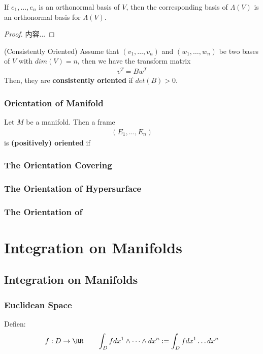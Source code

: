 \documentclass[Total.tex]{subfiles}
\begin{document}
				\begin{proposition}
					If $e_1,\dots,e_n$ is an orthonormal basis of $V$, then the corresponding basis of $\Lambda(V)$ is an orthonormal basis for $\Lambda(V)$.
				\end{proposition}
				\begin{proof}
					内容...
				\end{proof}
				
				
				\begin{Def}
					(Consistently Oriented) Assume that $(v_1,\dots,v_n)$ and $(w_1,\dots,w_n)$ be two bases of $V$ with $dim(V)=n$, then we have the transform matrix
					\begin{gather*}
						v^T=Bw^T
					\end{gather*}
					Then, they are \textbf{consistently oriented} if $det(B)>0$.
				\end{Def}
			\subsection{Orientation of Manifold}
				\begin{Def}
					Let $M$ be a manifold. Then a frame
					\begin{gather*}
						(E_1,\dots,E_n)
					\end{gather*}
					is \textbf{(positively) oriented} if
				\end{Def}
			\subsection{The Orientation Covering}
			\subsection{The Orientation of Hypersurface}
			\subsection{The Orientation of }
	\chapter{Integration on Manifolds}
		\section{Integration on Manifolds}
		\subsection{Euclidean Space}
			\begin{Def}
				Defien:
				\begin{gather*}
					f:D\rightarrow \RR\qquad \int_D fdx^1\wedge\dots\wedge dx^n:=\int_D fdx^1\dots dx^n
				\end{gather*}
			\end{Def}
\end{document}

